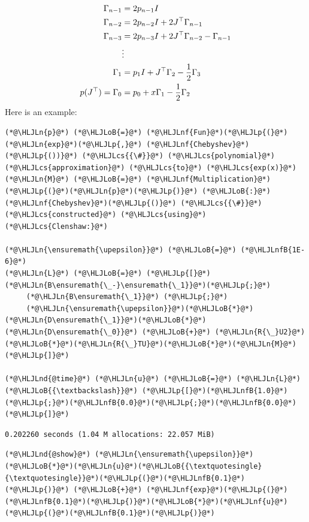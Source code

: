 \documentclass[12pt,a4paper]{article}
\newcommand{\HLJLn}[1]{#1}
\newcommand{\HLJLnd}[1]{\textcolor[RGB]{214,102,97}{#1}}
\newcommand{\HLJLnf}[1]{\textcolor[RGB]{66,102,213}{#1}}
\newcommand{\HLJLnfB}[1]{\textcolor[RGB]{59,151,46}{#1}}
\newcommand{\HLJLoB}[1]{\textcolor[RGB]{102,102,102}{\textbf{#1}}}
\newcommand{\HLJLp}[1]{#1}
\newcommand{\HLJLcs}[1]{\textcolor[RGB]{153,153,119}{\textit{#1}}}
\def\half{ {1 \over 2} }
\def\upepsilon{\varepsilon}
\begin{document}
\begin{align*}
\Gamma_{n-1} &= 2p_{n-1}I \\
\Gamma_{n-2} &= 2p_{n-2}I + 2J^\top \Gamma_{n-1} \\
\Gamma_{n-3} &= 2 p_{n-3}I + 2J^\top \Gamma_{n-2} - \Gamma_{n-1} \\
& \vdots \\
\Gamma_1 &= p_1I + J^\top \Gamma_2 - \half \Gamma_3 \\
p(J^\top) = \Gamma_0 &= p_0 + x \Gamma_1 - \half \Gamma_2
\end{align*}
Here is an example:


\begin{lstlisting}
(*@\HLJLn{p}@*) (*@\HLJLoB{=}@*) (*@\HLJLnf{Fun}@*)(*@\HLJLp{(}@*)(*@\HLJLn{exp}@*)(*@\HLJLp{,}@*) (*@\HLJLnf{Chebyshev}@*)(*@\HLJLp{())}@*) (*@\HLJLcs{{\#}}@*) (*@\HLJLcs{polynomial}@*) (*@\HLJLcs{approximation}@*) (*@\HLJLcs{to}@*) (*@\HLJLcs{exp(x)}@*)
(*@\HLJLn{M}@*) (*@\HLJLoB{=}@*) (*@\HLJLnf{Multiplication}@*)(*@\HLJLp{(}@*)(*@\HLJLn{p}@*)(*@\HLJLp{)}@*) (*@\HLJLoB{:}@*) (*@\HLJLnf{Chebyshev}@*)(*@\HLJLp{()}@*) (*@\HLJLcs{{\#}}@*) (*@\HLJLcs{constructed}@*) (*@\HLJLcs{using}@*) (*@\HLJLcs{Clenshaw:}@*)

(*@\HLJLn{\ensuremath{\upepsilon}}@*) (*@\HLJLoB{=}@*) (*@\HLJLnfB{1E-6}@*)
(*@\HLJLn{L}@*) (*@\HLJLoB{=}@*) (*@\HLJLp{[}@*)(*@\HLJLn{B\ensuremath{\_-}\ensuremath{\_1}}@*)(*@\HLJLp{;}@*) 
     (*@\HLJLn{B\ensuremath{\_1}}@*) (*@\HLJLp{;}@*) 
     (*@\HLJLn{\ensuremath{\upepsilon}}@*)(*@\HLJLoB{*}@*)(*@\HLJLn{D\ensuremath{\_1}}@*)(*@\HLJLoB{*}@*)(*@\HLJLn{D\ensuremath{\_0}}@*) (*@\HLJLoB{+}@*) (*@\HLJLn{R{\_}U2}@*)(*@\HLJLoB{*}@*)(*@\HLJLn{R{\_}TU}@*)(*@\HLJLoB{*}@*)(*@\HLJLn{M}@*)(*@\HLJLp{]}@*)

(*@\HLJLnd{@time}@*) (*@\HLJLn{u}@*) (*@\HLJLoB{=}@*) (*@\HLJLn{L}@*) (*@\HLJLoB{{\textbackslash}}@*) (*@\HLJLp{[}@*)(*@\HLJLnfB{1.0}@*)(*@\HLJLp{;}@*)(*@\HLJLnfB{0.0}@*)(*@\HLJLp{;}@*)(*@\HLJLnfB{0.0}@*)(*@\HLJLp{]}@*)
\end{lstlisting}

\begin{lstlisting}
0.202260 seconds (1.04 M allocations: 22.057 MiB)
\end{lstlisting}


\begin{lstlisting}
(*@\HLJLnd{@show}@*) (*@\HLJLn{\ensuremath{\upepsilon}}@*)(*@\HLJLoB{*}@*)(*@\HLJLn{u}@*)(*@\HLJLoB{{\textquotesingle}{\textquotesingle}}@*)(*@\HLJLp{(}@*)(*@\HLJLnfB{0.1}@*)(*@\HLJLp{)}@*) (*@\HLJLoB{+}@*) (*@\HLJLnf{exp}@*)(*@\HLJLp{(}@*)(*@\HLJLnfB{0.1}@*)(*@\HLJLp{)}@*)(*@\HLJLoB{*}@*)(*@\HLJLnf{u}@*)(*@\HLJLp{(}@*)(*@\HLJLnfB{0.1}@*)(*@\HLJLp{)}@*)
\end{lstlisting}
\end{document}
